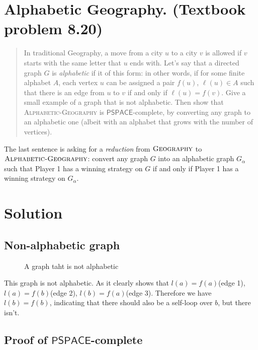 

\maketitle
\thispagestyle{firststyle}
\vspace{-2.0cm}

\section{Alphabetic Geography. (Textbook problem 8.20)}
\begin{quote}
    In traditional Geography, a move from a city $u$ to a city $v$ is allowed if $v$ starts with the same letter that $u$ ends with.
    Let’s say that a directed graph $G$ is \emph{alphabetic} if it of this form:
    in other words, if for some finite alphabet $A$,
    each vertex $u$ can be assigned a pair $f(u)$, $\ell(u) \in A$
    such that there is an edge from $u$ to $v$
    if and only if $\ell(u) = f(v)$.
    Give a small example of a graph that is not alphabetic.
    Then show that \textsc{Alphabetic-Geography} is $\mathsf{PSPACE}$-complete,
    by converting any graph to an alphabetic one
    (albeit with an alphabet that grows with the number of vertices).
\end{quote}
The last sentence is asking for a \emph{reduction} from $\textsc{Geography}$ to $\textsc{Alphabetic-Geography}$:
convert any graph $G$ into an alphabetic graph $G_\alpha$ such that
Player 1 has a winning strategy on $G$
if and only if
Player 1 has a winning strategy on $G_\alpha$.

\section*{Solution}

\subsection*{Non-alphabetic graph}

\begin{figure}[h]
    \centering
    \caption{A graph taht is not alphabetic}
\end{figure}

This graph is not alphabetic.
As it clearly shows that $l(a) = f(a)$(edge 1), $l(a) = f(b)$(edge 2), $l(b) = f(a)$(edge 3).
Therefore we have $l(b) = f(b)$, indicating that there should also be a self-loop over $b$, but there isn't.

\subsection*{Proof of $\mathsf{PSPACE}$-complete}

